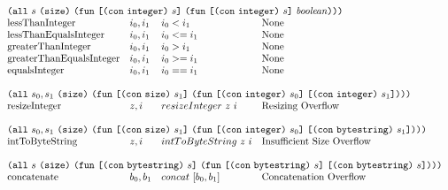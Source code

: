 \documentclass[../main.tex]{subfiles}
\begin{document}
\begin{figure*}[t]
\[\begin{array}{llll}
        \multicolumn{4}{l}{
          \allT{s}{\sizeK{}}{
            \funT{\appT{\conT{\conIntegerType{}}}{s}}
                 {\funT{\appT{\conT{\conIntegerType{}}}{s}}
                       {\mathit{boolean}}}}}\\
        \mathrm{lessThanInteger}            &  i_0 , i_1   &   i_0 < i_1    &   \textrm{None}         \\
        \mathrm{lessThanEqualsInteger}      &  i_0 , i_1   &   i_0 <= i_1   &   \textrm{None}         \\
        \mathrm{greaterThanInteger}         &  i_0 , i_1   &   i_0 > i_1    &   \textrm{None}         \\
        \mathrm{greaterThanEqualsInteger}   &  i_0 , i_1   &   i_0 >= i_1   &   \textrm{None}         \\
        \mathrm{equalsInteger}              &  i_0 , i_1   &   i_0 == i_1   &   \textrm{None}         \\
        &&\\
        
        \multicolumn{4}{l}{
          \allT{s_0,s_1}{\sizeK{}}{
            \funT{\appT{\conT{\conSizeType{}}}{s_1}}
                 {\funT{\appT{\conT{\conIntegerType{}}}{s_0}}
                       {\appT{\conT{\conIntegerType{}}}{s_1}}}}} \\
        \mathrm{resizeInteger}   &   z, i   &   resizeInteger ~ z ~ i   &   \textrm{Resizing Overflow} \\
        &&\\
        
        \multicolumn{4}{l}{
          \allT{s_0,s_1}{\sizeK{}}{
            \funT{\appT{\conT{\conSizeType{}}}{s_1}}
                 {\funT{\appT{\conT{\conIntegerType{}}}{s_0}}
                       {\appT{\conT{\conBytestringType{}}}{s_1}}}}}\\
        \mathrm{intToByteString}            &  z, i           &   intToByteString ~ z ~ i   &   \textrm{Insufficient Size Overflow} \\
        &&\\
        
        
        \multicolumn{4}{l}{
          \allT{s}{\sizeK{}}{
            \funT{\appT{\conT{\conBytestringType{}}}{s}}
                 {\funT{\appT{\conT{\conBytestringType{}}}{s}}
                       {\appT{\conT{\conBytestringType{}}}{s}}}}}\\
        \mathrm{concatenate}       &   b_0 , b_1   & concat ~ [b_0,b_1]   &   \textrm{Concatenation Overflow} \\
        &&\\
        

\end{array}\]
\end{figure*}
\end{document}
